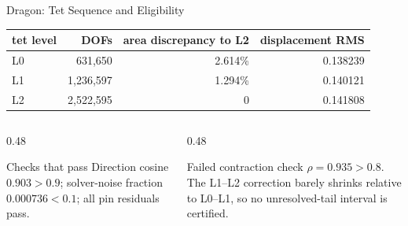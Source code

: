 \documentclass[aspectratio=169,10pt]{beamer}
\newcommand{\pct}[1]{#1\%}
\begin{document}
\begin{frame}{Dragon: Tet Sequence and Eligibility}
  \small
  \begin{table}
    \centering
    \begin{tabular}{lrrr}
      \toprule
      tet level & DOFs & area discrepancy to L2 & displacement RMS \\
      \midrule
      L0 & 631,650 & \pct{2.614} & 0.138239 \\
      L1 & 1,236,597 & \pct{1.294} & 0.140121 \\
      L2 & 2,522,595 & 0 & 0.141808 \\
      \bottomrule
    \end{tabular}
  \end{table}

  \vspace{0.6em}
  \begin{columns}[T]
    \begin{column}{0.48\linewidth}
      \begin{block}{Checks that pass}
        Direction cosine $0.903>0.9$; solver-noise fraction $0.000736<0.1$;
        all pin residuals pass.
      \end{block}
    \end{column}
    \begin{column}{0.48\linewidth}
      \begin{alertblock}{Failed contraction check}
        $\rho=0.935>0.8$. The L1--L2 correction barely shrinks relative to
        L0--L1, so no unresolved-tail interval is certified.
      \end{alertblock}
    \end{column}
  \end{columns}
\end{frame}
\end{document}
